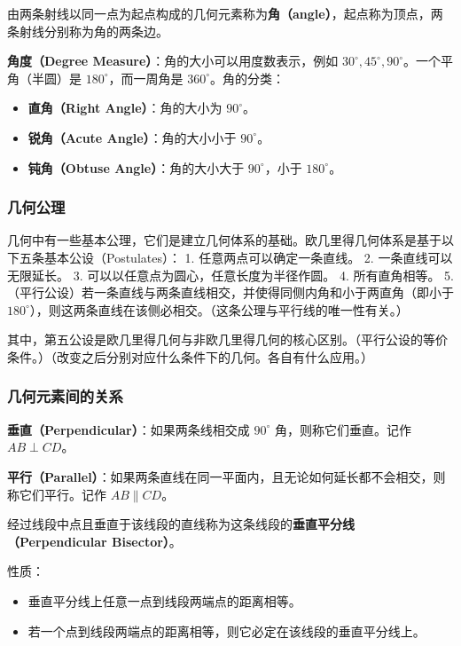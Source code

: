 由两条射线以同一点为起点构成的几何元素称为\textbf{角（angle）}，起点称为顶点，两条射线分别称为角的两条边。

\textbf{角度（Degree Measure）}：角的大小可以用度数表示，例如 $30^\circ, 45^\circ, 90^\circ$。一个平角（半圆）是 $180^\circ$，而一周角是 $360^\circ$。角的分类：
\begin{itemize}
    \item \textbf{直角（Right Angle）}：角的大小为 $90^\circ$。
    \item \textbf{锐角（Acute Angle）}：角的大小小于 $90^\circ$。
    \item \textbf{钝角（Obtuse Angle）}：角的大小大于 $90^\circ$，小于 $180^\circ$。
\end{itemize}

\subsubsection{几何公理}

几何中有一些基本公理，它们是建立几何体系的基础。欧几里得几何体系是基于以下五条基本公设（Postulates）：
	1.	任意两点可以确定一条直线。
	2.	一条直线可以无限延长。
	3.	可以以任意点为圆心，任意长度为半径作圆。
	4.	所有直角相等。
	5.	（平行公设）若一条直线与两条直线相交，并使得同侧内角和小于两直角（即小于 $180^\circ$），则这两条直线在该侧必相交。（这条公理与平行线的唯一性有关。）

其中，第五公设是欧几里得几何与非欧几里得几何的核心区别。（平行公设的等价条件。）（改变之后分别对应什么条件下的几何。各自有什么应用。）

\subsubsection{几何元素间的关系}

\textbf{垂直（Perpendicular）}：如果两条线相交成 $90^\circ$ 角，则称它们垂直。记作 $AB \perp CD$。

\textbf{平行（Parallel）}：如果两条直线在同一平面内，且无论如何延长都不会相交，则称它们平行。记作 $AB \parallel CD$。


经过线段中点且垂直于该线段的直线称为这条线段的\textbf{垂直平分线（Perpendicular Bisector）}。

性质：
\begin{itemize}
    \item 垂直平分线上任意一点到线段两端点的距离相等。
    \item 若一个点到线段两端点的距离相等，则它必定在该线段的垂直平分线上。
\end{itemize}

